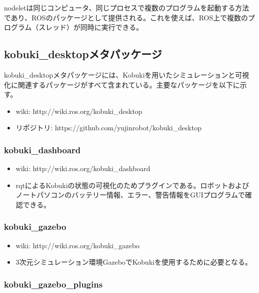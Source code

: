 \begin{exercise}[nodeletとは?]
nodeletは同じコンピュータ、同じプロセスで複数のプログラムを起動する方法であり、ROSのパッケージとして提供される。これを使えば、ROS上で複数のプログラム（スレッド）が同時に実行できる。
\end{exercise}

\subsection{kobuki\_desktopメタパッケージ}

kobuki\_desktopメタパッケージには、Kobukiを用いたシミュレーションと可視化に関連するパッケージがすべて含まれている。主要なパッケージを以下に示す。

\begin{itemize}
\item wiki: http://wiki.ros.org/kobuki\_desktop
\item リポジトリ: https://github.com/yujinrobot/kobuki\_desktop
\end{itemize}

\subsubsection{kobuki\_dashboard}

\begin{itemize}
 \item wiki:  http://wiki.ros.org/kobuki\_dashboard
\item rqtによるKobukiの状態の可視化のためプラグインである。ロボットおよびノートパソコンのバッテリー情報、エラー、警告情報をGUIプログラムで確認できる。
\end{itemize}

\subsubsection{kobuki\_gazebo}

\begin{itemize}
\item wiki: http://wiki.ros.org/kobuki\_gazebo
\item 3次元シミュレーション環境GazeboでKobukiを使用するために必要となる。
\end{itemize}

\subsubsection{kobuki\_gazebo\_plugins}

